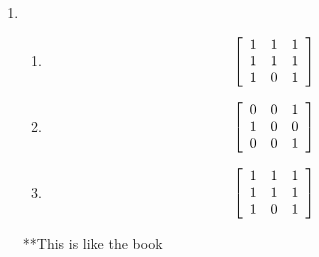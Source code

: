 \documentclass{article}
\begin{document}
\begin{enumerate}
\item
	\begin{enumerate}
	\item 
	\[
	\left[
	 \begin{array}{c c c}
		1 & 1 & 1\\
		1 & 1 & 1\\
		1 & 0 & 1
	 \end{array}
	\right]
	\]
	\item
	\[
	\left[
	 \begin{array}{c c c}
		0 & 0 & 1\\
		1 & 0 & 0\\
		0 & 0 & 1
	 \end{array}
	\right]
	\]
	\item
	\[
	\left[
	 \begin{array}{c c c}
		1 & 1 & 1\\
		1 & 1 & 1\\
		1 & 0 & 1
	 \end{array}
	\right]
	\]

	\end{enumerate}
	**This is like the book

\end{enumerate}
\end{document}

